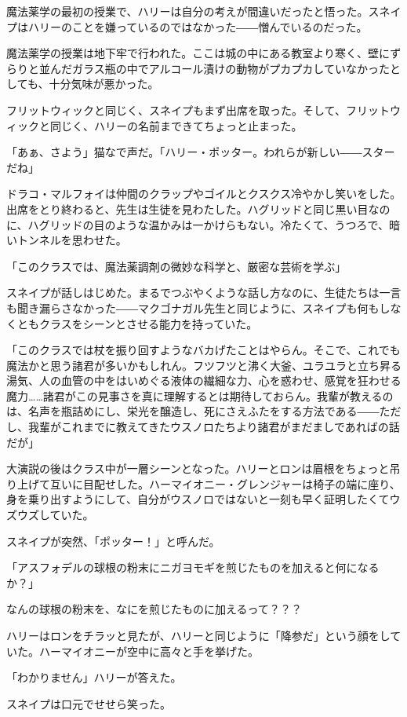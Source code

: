 \documentclass[10pt,a4paper]{article}
\begin{document}
\begin{CJK}{UTF8}{min}
魔法薬学の最初の授業で、ハリーは自分の考えが間違いだったと悟った。スネイプはハリーのことを嫌っているのではなかった――憎んでいるのだった。

魔法薬学の授業は地下牢で行われた。ここは城の中にある教室より寒く、壁にずらりと並んだガラス瓶の中でアルコール漬けの動物がプカプカしていなかったとしても、十分気味が悪かった。

フリットウィックと同じく、スネイプもまず出席を取った。そして、フリットウィックと同じく、ハリーの名前まできてちょっと止まった。

「あぁ、さよう」猫なで声だ。「ハリー・ポッター。われらが新しい――スターだね」

ドラコ・マルフォイは仲間のクラップやゴイルとクスクス冷やかし笑いをした。出席をとり終わると、先生は生徒を見わたした。ハグリッドと同じ黒い目なのに、ハグリッドの目のような温かみは一かけらもない。冷たくて、うつろで、暗いトンネルを思わせた。

「このクラスでは、魔法薬調剤の微妙な科学と、厳密な芸術を学ぶ」

スネイプが話しはじめた。まるでつぶやくような話し方なのに、生徒たちは一言も聞き漏らさなかった――マクゴナガル先生と同じように、スネイプも何もしなくともクラスをシーンとさせる能力を持っていた。

「このクラスでは杖を振り回すようなバカげたことはやらん。そこで、これでも魔法かと思う諸君が多いかもしれん。フツフツと沸く大釜、ユラユラと立ち昇る湯気、人の血管の中をはいめぐる液体の繊細な力、心を惑わせ、感覚を狂わせる魔力……諸君がこの見事さを真に理解するとは期待しておらん。我輩が教えるのは、名声を瓶詰めにし、栄光を醸造し、死にさえふたをする方法である――ただし、我輩がこれまでに教えてきたウスノロたちより諸君がまだましであればの話だが」

大演説の後はクラス中が一層シーンとなった。ハリーとロンは眉根をちょっと吊り上げて互いに目配せした。ハーマイオニー・グレンジャーは椅子の端に座り、身を乗り出すようにして、自分がウスノロではないと一刻も早く証明したくてウズウズしていた。

スネイプが突然、「ポッター！」と呼んだ。

「アスフォデルの球根の粉末にニガヨモギを煎じたものを加えると何になるか？」

なんの球根の粉末を、なにを煎じたものに加えるって？？？

ハリーはロンをチラッと見たが、ハリーと同じように「降参だ」という顔をしていた。ハーマイオニーが空中に高々と手を挙げた。

「わかりません」ハリーが答えた。

スネイプは口元でせせら笑った。


\end{CJK}
\end{document}
